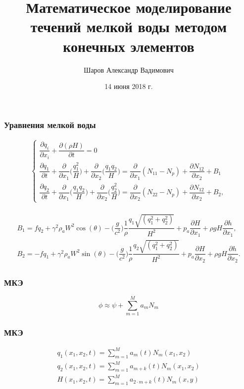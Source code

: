 \documentclass[10pt,utf8,presentation,compress]{beamer}
\title[Мат. моделирование течений мелкой воды с помощью МКЭ]{Математическое моделирование течений мелкой воды методом конечных элементов}
\author[Шаров Александр Вадимович]{Шаров Александр Вадимович}
\institute[<<Прикладная математика и информатика>>]{<<Прикладная математика и информатика>>}
\date{14 июня 2018 г.}
\begin{document}
\frame[plain]{\titlepage}

\begin{frame}
\frametitle{Уравнения мелкой воды}
	\begin{eqnarray*}
	\begin{cases}
		\dfrac{ \partial q_i}{\partial x_i} + \dfrac{\partial(\rho H)}{\partial t} = 0 \\
		\dfrac{\partial q_1}{\partial t} + \dfrac{\partial}{\partial x_1} \bigg(\dfrac{q_1^2}{H}\bigg)+\dfrac{\partial }{\partial x_2}\bigg(\dfrac{q_1 q_2}{H}\bigg) = \dfrac{\partial}{\partial x_1} (N_{11}-N_p) + \dfrac{\partial N_{12}}{\partial x_2} + B_1 \\
		\dfrac{\partial q_2}{\partial t} + \dfrac{\partial}{\partial x_1} \bigg(\dfrac{q_1 q_2}{H}\bigg)+\dfrac{\partial }{\partial x_2}\bigg(\dfrac{q_2^2}{H}\bigg) = \dfrac{\partial}{\partial x_2} (N_{22}-N_p) + \dfrac{\partial N_{12}}{\partial x_2} + B_2,
	\end{cases}
	\end{eqnarray*}

	\begin{eqnarray*}
	\begin{aligned}
		B_1=fq_2+\gamma^2\rho_aW^2\cos(\theta)-\bigg(\dfrac{g}{c^2}\bigg)\dfrac{1}{\rho}\dfrac{q_1\sqrt{(q_1^2+q_2^2)}}{H^2} + p_a \dfrac{\partial H}{\partial x_1} + \rho gH\dfrac{\partial h}{\partial x_1}, \\
		B_2=-fq_1+\gamma^2\rho_aW^2\sin(\theta)-\bigg(\dfrac{g}{c^2}\bigg)\dfrac{1}{\rho}\dfrac{q_2\sqrt{(q_1^2+q_2^2)}}{H^2} + p_a \dfrac{\partial H}{\partial x_2} + \rho gH\dfrac{\partial h}{\partial x_2}.
	\end{aligned}
	\end{eqnarray*}
\end{frame}

\begin{frame}
\frametitle{МКЭ}
	\begingroup
	\huge
		\begin{equation*}
			\phi \approx \psi + \sum\limits_{m=1}^{M} a_mN_m
		\end{equation*}
	\endgroup
\end{frame}

\begin{frame}
\frametitle{МКЭ}
	\begingroup
	\Large
		\begin{eqnarray*}
			q_1(x_1, x_2, t) = \sum\limits_{m=1}^{M} a_m(t)N_m(x_1, x_2) \\
			q_2(x_1, x_2, t) = \sum\limits_{m=1}^{M} a_{m+k}(t)N_m(x_1, x_2) \\
			H(x_1, x_2, t) = \sum\limits_{m=1}^{M} a_{2\cdot m+k}(t)N_m(x, y)
		\end{eqnarray*}
	\endgroup
\end{frame}
\end{document}
